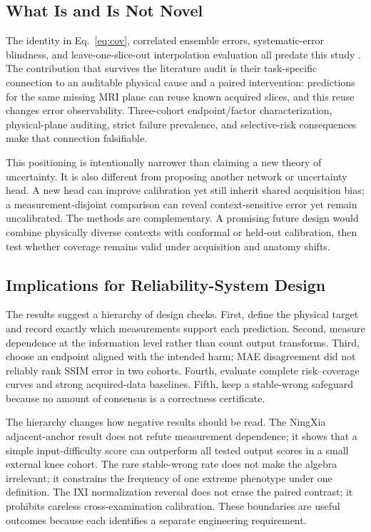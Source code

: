 \documentclass[journal,10pt]{IEEEtran}
\begin{document}
\subsection{What Is and Is Not Novel}
The identity in Eq.~\eqref{eq:cov}, correlated ensemble errors, systematic-error blindness, and leave-one-slice-out interpolation evaluation all predate this study \cite{brown2005diversity,hu2021predict,horvath2017highorder}. The contribution that survives the literature audit is their task-specific connection to an auditable physical cause and a paired intervention: predictions for the same missing MRI plane can reuse known acquired slices, and this reuse changes error observability. Three-cohort endpoint/factor characterization, physical-plane auditing, strict failure prevalence, and selective-risk consequences make that connection falsifiable.

This positioning is intentionally narrower than claiming a new theory of uncertainty. It is also different from proposing another network or uncertainty head. A new head can improve calibration yet still inherit shared acquisition bias; a measurement-disjoint comparison can reveal context-sensitive error yet remain uncalibrated. The methods are complementary. A promising future design would combine physically diverse contexts with conformal or held-out calibration, then test whether coverage remains valid under acquisition and anatomy shifts.

\subsection{Implications for Reliability-System Design}
The results suggest a hierarchy of design checks. First, define the physical target and record exactly which measurements support each prediction. Second, measure dependence at the information level rather than count output transforms. Third, choose an endpoint aligned with the intended harm; MAE disagreement did not reliably rank SSIM error in two cohorts. Fourth, evaluate complete risk--coverage curves and strong acquired-data baselines. Fifth, keep a stable-wrong safeguard because no amount of consensus is a correctness certificate.

The hierarchy changes how negative results should be read. The NingXia adjacent-anchor result does not refute measurement dependence; it shows that a simple input-difficulty score can outperform all tested output scores in a small external knee cohort. The rare stable-wrong rate does not make the algebra irrelevant; it constrains the frequency of one extreme phenotype under one definition. The IXI normalization reversal does not erase the paired contrast; it prohibits careless cross-examination calibration. These boundaries are useful outcomes because each identifies a separate engineering requirement.
\end{document}
